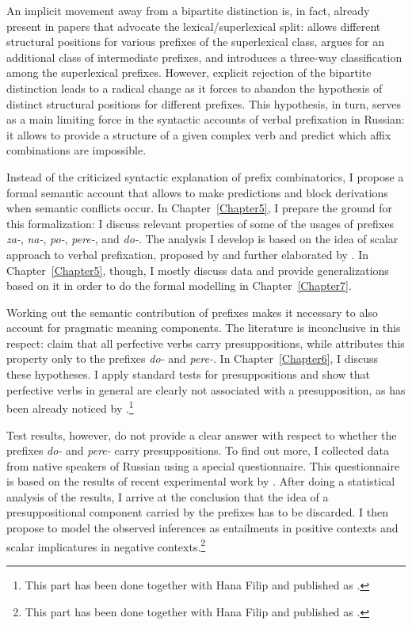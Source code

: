 An implicit movement away from a bipartite distinction is, in fact, already present in papers that advocate the lexical/superlexical split: \citet{Svenonius:04b} allows different structural positions for various prefixes of the superlexical class, \citet{Tatevosov:07} argues for an additional class of intermediate prefixes, and \citet{Tatevosov:09} introduces a three-way classification among the superlexical prefixes. However, explicit rejection of the bipartite distinction leads to a radical change as it forces to abandon the hypothesis of distinct structural positions for different prefixes. This hypothesis, in turn, serves as a main limiting force in the syntactic accounts of verbal prefixation in Russian: it allows to provide a structure of a given complex verb and predict which affix combinations are impossible.

Instead of the criticized syntactic explanation of prefix combinatorics, I propose a formal semantic account that allows to make predictions and block derivations when semantic conflicts occur. In Chapter~\ref{Chapter5}, I prepare the ground for this formalization: I discuss relevant properties of some of the usages of prefixes \textit{\mbox{za-}}, \textit{na-}, \textit{po-}, \textit{pere-}, and \textit{do-}. The analysis I develop is based on the idea of scalar approach to verbal prefixation, proposed by \citet{Filip:08} and further elaborated by \citet{Kagan:12, Kagan:book}. In Chapter~\ref{Chapter5}, though, I mostly discuss data and provide generalizations based on it in order to do the formal modelling in Chapter~\ref{Chapter7}.

Working out the semantic contribution of prefixes makes it necessary to also account for pragmatic meaning components. The literature is inconclusive in this respect: \citep{Paducheva:96, Romanova:06} claim that all perfective verbs carry presuppositions, while \citet{Kagan:book} attributes this property only to the prefixes \textit{do-} and \textit{pere-}. In Chapter~\ref{Chapter6}, I discuss these hypotheses. I apply standard tests for presuppositions and show that perfective verbs in general are clearly not associated with a presupposition, as has been already noticed by \citet{Gronn:04}.\footnote{This part has been done together with Hana Filip and published as \citealt{ZinovaFilip:14}.}

Test results, however, do not provide a clear answer with respect to whether the prefixes \textit{do-} and \textit{pere-} carry presuppositions. To find out more, I collected data from native speakers of Russian using a special questionnaire. This questionnaire is based on the results of recent experimental work by \citet{Chemla:09}. After doing a statistical analysis of the results, I arrive at the conclusion that the idea of a presuppositional component carried by the prefixes has to be discarded. I then propose to model the observed inferences as entailments in positive contexts and scalar implicatures in negative contexts.\footnote{This part has been done together with Hana Filip and published as \citealt{ZinovaFilip:SALT}.}

